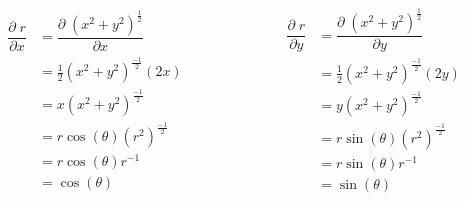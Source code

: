 \documentclass[12pt, fleqn]{report}                             %
\DeclareMathOperator \Space     {\quad}                         %
\theoremstyle{break}                                            %
\newcommand{\Wrap}[1]           {\left( #1 \right)}             %
\newcommand{\Cos}[1] {\cos\Wrap{#1}}                            %
\newcommand{\Sin}[1] {\sin\Wrap{#1}}                            %
\newcommand \Partial[2] {\dfrac{\partial \; #1}{\partial #2}}   %
\begin{document}
                    \begin{equation*}
                        \begin{split}
                            \Partial{r}{x}
                                &= \Partial{\Wrap{x^2 + y^2}^{\frac{1}{2}}}{x}      \\
                                &= \frac{1}{2}\Wrap{x^2 + y^2}^{\frac{-1}{2}}(2x)   \\ 
                                &= x \Wrap{x^2 + y^2}^{\frac{-1}{2}}                \\
                                &= r\Cos{\theta} \Wrap{r^2}^{\frac{-1}{2}}          \\
                                &= r\Cos{\theta} r^{-1}                             \\
                                &= \Cos{\theta}     
                        \end{split}
                        \Space\Space
                        \Space\Space
                        \begin{split}
                            \Partial{r}{y}
                                &= \Partial{\Wrap{x^2 + y^2}^{\frac{1}{2}}}{y}      \\
                                &= \frac{1}{2}\Wrap{x^2 + y^2}^{\frac{-1}{2}}(2y)   \\
                                &= y \Wrap{x^2 + y^2}^{\frac{-1}{2}}                \\
                                &= r\Sin{\theta} \Wrap{r^2}^{\frac{-1}{2}}          \\
                                &= r\Sin{\theta} r^{-1}                             \\
                                &= \Sin{\theta}                                     
                        \end{split}
                    \end{equation*}
\end{document}
